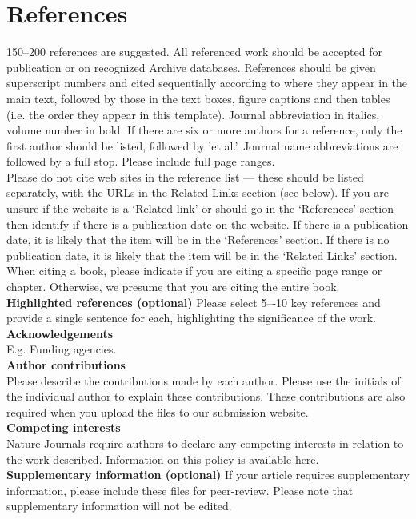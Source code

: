 \documentclass[fleqn,10pt]{wlscirep}
\begin{document}
\section*{References} 

150–200 references are suggested. All referenced work should be accepted for publication or on recognized Archive databases. References should be given superscript numbers and cited sequentially according to where they appear in the main text, followed by those in the text boxes, figure captions and then tables (i.e. the order they appear in this template).
Journal abbreviation in italics, volume number in bold. If there are six or more authors for a reference, only the first author should be listed, followed by 'et al.'. Journal name abbreviations are followed by a full stop. Please include full page ranges. \\

\noindent Please do not cite web sites in the reference list — these should be listed separately, with the URLs in the Related Links section (see below).  If you are unsure if the website is a ‘Related link’ or should go in the ‘References’ section then identify if there is a publication date on the website.  If there is a publication date, it is likely that the item will be in the ‘References’ section.  If there is no publication date, it is likely that the item will be in the ‘Related Links’ section.\\

\noindent When citing a book, please indicate if you are citing a specific page range or chapter.  Otherwise, we presume that you are citing the entire book.  \\

\noindent \textbf{Highlighted references (optional)} Please select 5–-10 key references and provide a single sentence for each, highlighting the significance of the work.\\

\noindent\textbf{Acknowledgements}\\
E.g. Funding agencies.\\

\noindent\textbf{Author contributions}\\
Please describe the contributions made by each author.  Please use the initials of the individual author to explain these contributions.  These contributions are also required when you upload the files to our submission website.\\

\noindent\textbf{Competing interests}\\
Nature Journals require authors to declare any competing interests in relation to the work described. Information on this policy is available \href{http://www.nature.com/authors/policies/competing.html}{here}. \\



\noindent\textbf{Supplementary information (optional)}
If your article requires supplementary information, please include these files for peer-review. Please note that supplementary information will not be edited.
\end{document}

